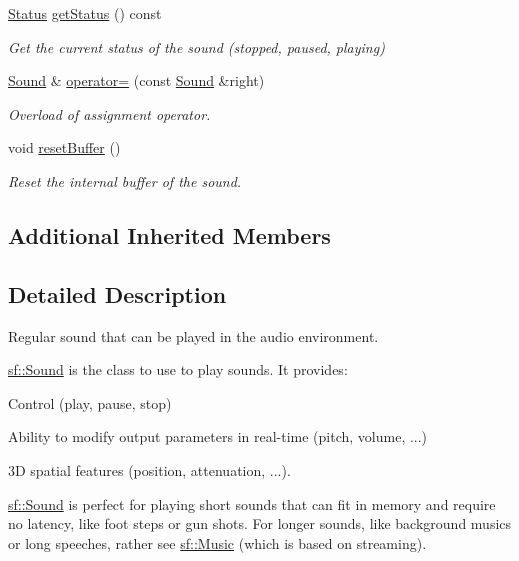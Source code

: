 \begin{DoxyCompactItemize}
\hyperlink{classsf_1_1_sound_source_ac43af72c98c077500b239bc75b812f03}{Status} \hyperlink{classsf_1_1_sound_a406fc363594a7718a53ebef49a870f51}{get\+Status} () const
\begin{DoxyCompactList}\small\item\em Get the current status of the sound (stopped, paused, playing) \end{DoxyCompactList}\item 
\hyperlink{classsf_1_1_sound}{Sound} \& \hyperlink{classsf_1_1_sound_a08c64c9c1dabeebc59fbf2540d81d4dd}{operator=} (const \hyperlink{classsf_1_1_sound}{Sound} \&right)
\begin{DoxyCompactList}\small\item\em Overload of assignment operator. \end{DoxyCompactList}\item 
void \hyperlink{classsf_1_1_sound_acb7289d45e06fb76b8292ac84beb82a7}{reset\+Buffer} ()
\begin{DoxyCompactList}\small\item\em Reset the internal buffer of the sound. \end{DoxyCompactList}\end{DoxyCompactItemize}
\subsection*{Additional Inherited Members}


\subsection{Detailed Description}
Regular sound that can be played in the audio environment. 

\hyperlink{classsf_1_1_sound}{sf\+::\+Sound} is the class to use to play sounds. It provides\+: \begin{DoxyItemize}
\item Control (play, pause, stop) \item Ability to modify output parameters in real-\/time (pitch, volume, ...) \item 3D spatial features (position, attenuation, ...).\end{DoxyItemize}
\hyperlink{classsf_1_1_sound}{sf\+::\+Sound} is perfect for playing short sounds that can fit in memory and require no latency, like foot steps or gun shots. For longer sounds, like background musics or long speeches, rather see \hyperlink{classsf_1_1_music}{sf\+::\+Music} (which is based on streaming).


